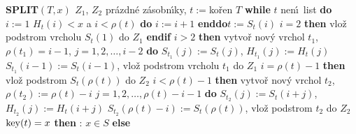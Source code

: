 {\bf SPLIT$(T,x)$\newline 
$Z_1$}, $Z_2$ pr\'azdn\'e z\'asobn\'\i ky, $t:=$ko\v ren $T$\newline 
{\bf while} $t$ nen\'\i\ list {\bf do}\newline
\phantom{---}$i:=1$\newline 
\phantom{---}{\bf while} $H_t(i)<x$ a $i<\rho (t)$ {\bf do} $i:=i+1$ {\bf enddo}\newline \phantom{---}$t:=S_t(i)$\newline 
\phantom{---}{\bf if} $i=2$ {\bf then} vlo\v z podstrom vrcholu $S_t(1)$ do $Z_1$ 
{\bf endif}\newline 
\phantom{---}{\bf if} $i>2$ {\bf then}\newline 
\phantom{------}vytvo\v r nov\'y vrchol $t_1$, $\rho (t_1)=i-1$,\newline 
\phantom{------}{\bf for every} $j=1,2,\dots,i-2$ {\bf do}\newline 
\phantom{---------}$S_{t_1}(j):=S_t(j)$, $H_{t_1}(j):=H_t(j)$\newline 
\phantom{------}{\bf enddo}\newline 
\phantom{------}$S_{t_1}(i-1):=S_t(i-1)$, vlo\v z podstrom vrcholu $t_1$ do $Z_1$\newline 
\phantom{---}{\bf endif}\newline 
\phantom{---}{\bf if} $i=\rho (t)-1$ {\bf then}\newline 
\phantom{------}vlo\v z podstrom $S_t(\rho (t))$ do $Z_2$ 
\phantom{---}{\bf endif}\newline 
\phantom{---}{\bf if} $i<\rho (t)-1$ {\bf then}\newline 
\phantom{------}vytvo\v r nov\'y vrchol $t_2$, $\rho (t_2):=\rho (t)-i$\newline 
\phantom{------}{\bf for every} $j=1,2,\dots,\rho (t)-i-1$ {\bf do}\newline 
\phantom{---------}$S_{t_2}(j):=S_t(i+j)$, $H_{t_2}(j):=H_t(i+j)$\newline 
\phantom{------}{\bf enddo}\newline 
\phantom{------}$S_{t_2}(\rho (t)-i):=S_t(\rho (t))$, vlo\v z podstrom $t_2$ do $Z_2$ \newline 
\phantom{---}{\bf endif\newline 
enddo\newline 
if} $\operatorname{key}(t)=x$ {\bf then}\newline 
\phantom{---}{\bf V\'ystup}: $x\in S$\newline 
{\bf else}\newline 
